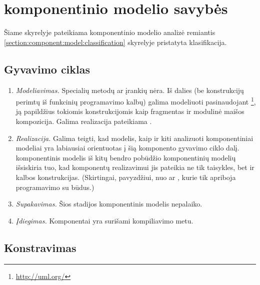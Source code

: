 \section{ komponentinio modelio savybės}

Šiame skyrelyje pateikiama  komponentinio modelio
analizė remiantis \ref{section:component:model:classification}
skyrelyje pristatyta \cite{classification-framework-for-scm}
klasifikacija.

\subsection{Gyvavimo ciklas}

\begin{enumerate}
  \item \emph{Modeliavimas.}
    Specialių metodų ar įrankių nėra. Iš dalies (be konstrukcijų
    perimtų iš funkcinių programavimo kalbų) galima modeliuoti
    pasinaudojant \footnote{\url{http://uml.org/}}, ją
    papildžius tokiomis konstrukcijomis kaip fragmentas ir
    modulinė maišos kompozicija. Galima realizacija pateikiama
    \cite[145]{rachimow2009scala}.
  \item \emph{Realizacija.}
    Galima teigti, kad  modelis, kaip ir kiti
    \cite{classification-framework-for-scm} analizuoti komponentiniai
    modeliai yra labiausiai orientuotas į šią komponento gyvavimo
    ciklo dalį.  komponentinis modelis iš kitų
    bendro pobūdžio komponentinių modelių išsiskiria tuo, kad
    komponentų realizavimui jis pateikia ne tik taisykles, bet ir
    kalbos konstrukcijas. (Skirtingai, pavyzdžiui, nuo 
    ar , kurie tik apriboja programavimo su
     būdus.)
  \item \emph{Supakavimas.}
    Šios stadijos  komponentinis modelis nepalaiko.
  \item \emph{Įdiegimas.}
    Komponentai yra surišami kompiliavimo metu.
\end{enumerate}

\subsection{Konstravimas}

